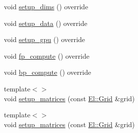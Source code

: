 \begin{DoxyCompactItemize}
\item 
void \hyperlink{classlbann_1_1fully__connected__layer_aaf38e55b232b1bb2a6336ff1807b5a17}{setup\+\_\+dims} () override
\item 
void \hyperlink{classlbann_1_1fully__connected__layer_aec4298146845489597126503177d3127}{setup\+\_\+data} () override
\item 
void \hyperlink{classlbann_1_1fully__connected__layer_a95c96742a67f2e9398e608b244c2d121}{setup\+\_\+gpu} () override
\item 
void \hyperlink{classlbann_1_1fully__connected__layer_a6dac6598c6b4ad3f766c5f0e88035f10}{fp\+\_\+compute} () override
\item 
void \hyperlink{classlbann_1_1fully__connected__layer_a8cc9a10e336f61ef54d5e3f4a9ffdfb8}{bp\+\_\+compute} () override
\item 
{\footnotesize template$<$$>$ }\\void \hyperlink{classlbann_1_1fully__connected__layer_a1f0ae7a5f172e5ced011eaa2755fd04e}{setup\+\_\+matrices} (const \hyperlink{base_8hpp_a9951bb1719d534e0401b1f06cad19eab}{El\+::\+Grid} \&grid)
\item 
{\footnotesize template$<$$>$ }\\void \hyperlink{classlbann_1_1fully__connected__layer_a9af60f901a84d5604badf078ecbae082}{setup\+\_\+matrices} (const \hyperlink{base_8hpp_a9951bb1719d534e0401b1f06cad19eab}{El\+::\+Grid} \&grid)
\end{DoxyCompactItemize}
